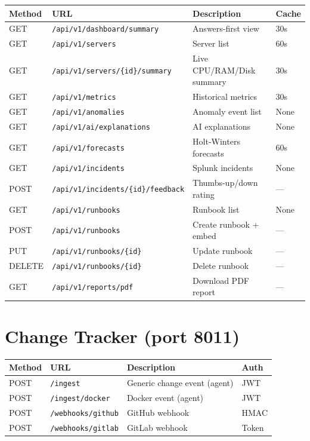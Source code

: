 \begin{longtable}{llp{4.5cm}p{3.5cm}}
\toprule
\textbf{Method} & \textbf{URL} & \textbf{Description} & \textbf{Cache} \\
\midrule
\endhead
\bottomrule
\endfoot
GET  & \texttt{/api/v1/dashboard/summary}       & Answers-first view        & 30s \\
GET  & \texttt{/api/v1/servers}                 & Server list               & 60s \\
GET  & \texttt{/api/v1/servers/\{id\}/summary}  & Live CPU/RAM/Disk summary & 30s \\
GET  & \texttt{/api/v1/metrics}                 & Historical metrics        & 30s \\
GET  & \texttt{/api/v1/anomalies}               & Anomaly event list        & None \\
GET  & \texttt{/api/v1/ai/explanations}         & AI explanations           & None \\
GET  & \texttt{/api/v1/forecasts}               & Holt-Winters forecasts    & 60s \\
GET  & \texttt{/api/v1/incidents}               & Splunk incidents          & None \\
POST & \texttt{/api/v1/incidents/\{id\}/feedback} & Thumbs-up/down rating   & — \\
GET  & \texttt{/api/v1/runbooks}                & Runbook list              & None \\
POST & \texttt{/api/v1/runbooks}                & Create runbook + embed    & — \\
PUT  & \texttt{/api/v1/runbooks/\{id\}}         & Update runbook            & — \\
DELETE & \texttt{/api/v1/runbooks/\{id\}}       & Delete runbook            & — \\
GET  & \texttt{/api/v1/reports/pdf}             & Download PDF report       & — \\
\end{longtable}

\section{Change Tracker (port 8011)}

\begin{longtable}{llp{5cm}p{3cm}}
\toprule
\textbf{Method} & \textbf{URL} & \textbf{Description} & \textbf{Auth} \\
\midrule
\endhead
\bottomrule
\endfoot
POST & \texttt{/ingest}            & Generic change event (agent) & JWT \\
POST & \texttt{/ingest/docker}     & Docker event (agent)         & JWT \\
POST & \texttt{/webhooks/github}   & GitHub webhook               & HMAC \\
POST & \texttt{/webhooks/gitlab}   & GitLab webhook               & Token \\
\end{longtable}
